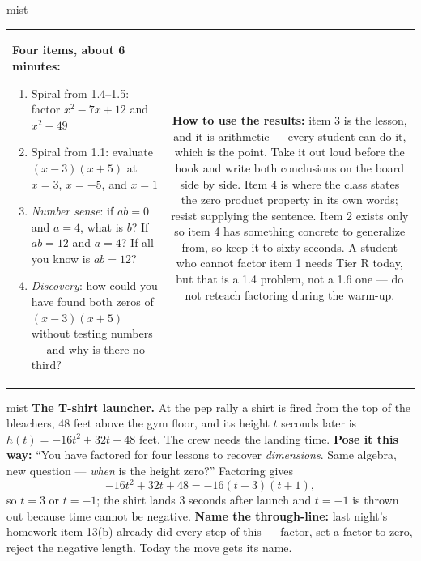 \documentclass[10pt]{article}
\begin{document}
\begin{fixedskillbox}{mist}
\begin{tabularx}{\linewidth}{@{}X c@{}}
\begin{minipage}[t]{0.55\linewidth}\vspace{0pt}
\textbf{Four items, about 6 minutes:}
\begin{enumerate}[leftmargin=1.4em, itemsep=1pt, topsep=2pt]
  \item Spiral from 1.4--1.5: factor $x^2-7x+12$ and $x^2-49$
  \item Spiral from 1.1: evaluate $(x-3)(x+5)$ at $x=3$, $x=-5$, and $x=1$
  \item \emph{Number sense}: if $ab=0$ and $a=4$, what is $b$? If $ab=12$ and $a=4$? If all you
        know is $ab=12$?
  \item \emph{Discovery}: how could you have found both zeros of $(x-3)(x+5)$ without testing
        numbers --- and why is there no third?
\end{enumerate}
\end{minipage}
&
\begin{minipage}[t]{0.38\linewidth}\vspace{0pt}
\textbf{How to use the results:} item 3 is the lesson, and it is arithmetic --- every student can
do it, which is the point. Take it out loud before the hook and write both conclusions on the
board side by side. Item 4 is where the class states the zero product property in its own words;
resist supplying the sentence. Item 2 exists only so item 4 has something concrete to generalize
from, so keep it to sixty seconds. A student who cannot factor item 1 needs Tier R today, but that
is a 1.4 problem, not a 1.6 one --- do not reteach factoring during the warm-up.
\end{minipage}
\end{tabularx}
\end{fixedskillbox}

\begin{skillbox}[Hook]{mist}
\textbf{The T-shirt launcher.} At the pep rally a shirt is fired from the top of the bleachers, $48$
feet above the gym floor, and its height $t$ seconds later is $h(t)=-16t^2+32t+48$ feet. The crew
needs the landing time. \textbf{Pose it this way:} ``You have factored for four lessons to recover
\emph{dimensions}. Same algebra, new question --- \emph{when} is the height zero?'' Factoring gives
\[ -16t^2+32t+48 = -16(t-3)(t+1), \]
so $t=3$ or $t=-1$; the shirt lands $3$ seconds after launch and $t=-1$ is thrown out because time
cannot be negative. \textbf{Name the through-line:} last night's homework item 13(b) already did
every step of this --- factor, set a factor to zero, reject the negative length. Today the move gets
its name.
\end{skillbox}
\end{document}
